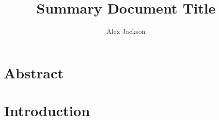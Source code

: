 \documentclass{summary}
\title{Summary Document Title}
\author{Alex Jackson}
\begin{document}
\thispagestyle{empty}
\maketitle

\section*{Abstract}

\tableofcontents

\section{Introduction}

\end{document}
